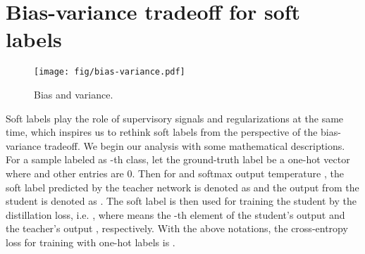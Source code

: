 \documentclass{article} \usepackage{iclr2021_conference,times}
\begin{document}
\section{Bias-variance tradeoff for soft labels}
\begin{wrapfigure}{r}{0.3\textwidth}
    \vspace{-40pt}
\begin{center}
    \texttt{[image: fig/bias-variance.pdf]}
    \end{center}
    \vspace{-5pt}
    \caption{Bias and variance.}
    \label{fig:bias-variance}
    \vspace{-8pt}
\end{wrapfigure}
Soft labels play the role of supervisory signals and regularizations at the same time, which inspires us to rethink soft labels from the perspective of the bias-variance tradeoff.
We begin our analysis with some mathematical descriptions. For a sample  labeled as -th class, let the ground-truth label be a one-hot vector  where  and other entries are 0. Then for  and softmax output temperature , the soft label predicted by the teacher network is denoted as  and the output from the student is denoted as . 
The soft label  is then used for training the student by the distillation loss, i.e. , where  means the -th element of the student's output  and the teacher's output , respectively. With the above notations, the cross-entropy loss for training with one-hot labels is .
\end{document}

